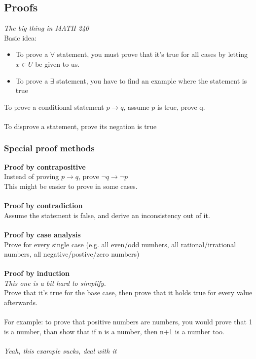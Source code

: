\documentclass{article}
\begin{document}
\subsection{Proofs}
\textit{The big thing in MATH 240}\\
Basic idea:
\begin{itemize}
    \item To prove a $\forall$ statement, you must prove that it's true for all cases by letting $x\in U$ be given to us.
    \item To prove a $\exists$ statement, you have to find an example where the statement is true
\end{itemize}
To prove a conditional statement $p\rightarrow q$, assume $p$ is true, prove q.\\\\
To disprove a statement, prove its negation is true
\subsubsection{Special proof methods}
\textbf{Proof by contrapositive}\\
Instead of proving $p\rightarrow q$, prove $\neg q\rightarrow\neg p$\\
This might be easier to prove in some cases.\\\\
\textbf{Proof by contradiction}\\
Assume the statement is false, and derive an inconsistency out of it.\\\\
\textbf{Proof by case analysis}\\
Prove for every single case (e.g. all even/odd numbers, all rational/irrational numbers, all negative/postive/zero numbers)\\\\
\textbf{Proof by induction}\\
\textit{This one is a bit hard to simplify.}\\
Prove that it's true for the base case, then prove that it holds true for every value afterwards.\\\\
For example: to prove that positive numbers are numbers, you would prove that 1 is a number, than show that if n is a number, then n+1 is a number too.\\\\
\textit{Yeah, this example sucks, deal with it}
\end{document}
